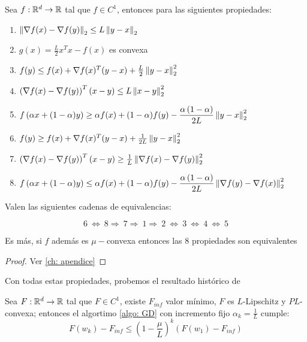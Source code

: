 \begin{proposition}
	\label{prop: Implicancias L Lipschitz}
	Sea $f:{\mathbb{R}}^d \rightarrow {\mathbb{R}}$ tal que $f \in C^1$, entonces para las siguientes propiedades:
	\begin{enumerate}
		\item $\left\lVert\nabla f(x) - \nabla f (y)\right\rVert_2 \leq  L\left\lVert y-x\right\rVert_2$
		\item $g(x) = \frac{L}{2} x^Tx - f(x)$ es convexa
		\item $f(y) \leq f(x) + \nabla f(x)^T (y-x) + \frac{L}{2}\left\lVert y-x\right\rVert_2^2$
		\item $\left(\nabla f(x) - \nabla f(y)\right)^T (x-y) \leq L\left\lVert x-y\right\rVert^2_2$
		\item $f\left(\alpha x + (1-\alpha)y\right) \geq \alpha f(x) + (1-\alpha) f(y) - \dfrac{\alpha \left(1 - \alpha \right)}{2L}\left\lVert y-x\right\rVert_2^2$
		\item $f(y) \geq f(x) + \nabla f(x)^T (y-x) +\frac{1}{2L} \left\lVert y-x\right\rVert^2_2$
		\item $\left(\nabla f(x) - \nabla f(y)\right)^T (x-y) \geq \frac{1}{L}\left\lVert\nabla f(x)- \nabla f(y)\right\rVert^2_2$
		\item $f\left(\alpha x + (1-\alpha)y\right) \leq \alpha f(x) + (1-\alpha) f(y) - \dfrac{\alpha \left(1 - \alpha \right)}{2L}\left\lVert\nabla f(y)- \nabla f (x)\right\rVert_2^2$
	\end{enumerate}

	Valen las siguientes cadenas de equivalencias:
	
	\begin{equation*}
		6 \ \Longleftrightarrow \ 8 \Longrightarrow \ 7 \Longrightarrow \ 1 \Longrightarrow \ 2 \ \Longleftrightarrow \ 3 \ \Longleftrightarrow \ 4 \ \Longleftrightarrow \ 5
	\end{equation*}
	
	Es m\'as, si $f$ adem\'as es $\mu-$convexa entonces las 8 propiedades son equivalentes
\end{proposition}

\begin{proof}
	Ver \ref{ch: apendice}
\end{proof}

Con todas estas propiedades, probemos el resultado hist\'orico de  \cite{polyak:1963}

\begin{theorem}
	\label{theorem: convergencia lineal GD}
	Sea $F:{\mathbb{R}}^d \rightarrow {\mathbb{R}}$ tal que $F \in C^1$, existe $F_{inf}$ valor m\'inimo, $F$ es $L$-Lipschitz y $PL$-convexa; entonces el algortimo \ref{algo: GD} con incremento fijo $\alpha_k = \frac{1}{L}$ cumple:
	\begin{equation}
	F(w_k) - F_{inf} \leq \left(1 - \frac{\mu}{L}\right)^k \left(F(w_1) - F_{inf}\right)
	\end{equation}
\end{theorem}

